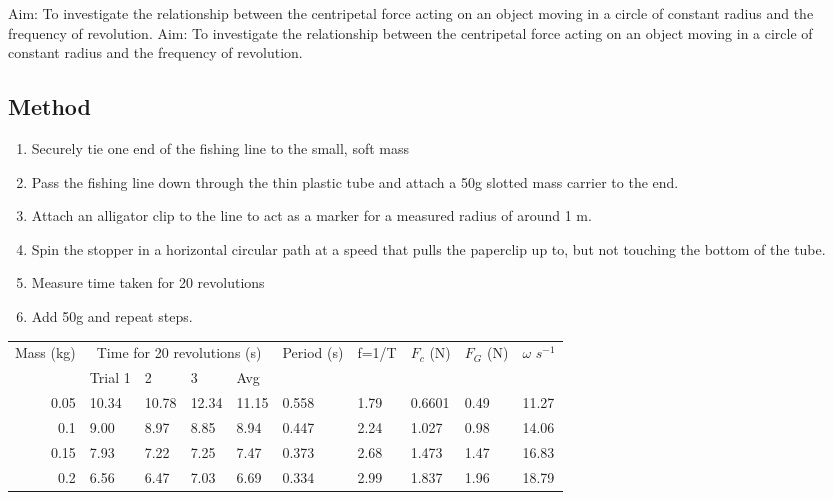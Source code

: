 	Aim: To investigate the relationship between the centripetal force acting on an object moving in a circle of constant radius and the frequency of revolution.
	Aim: To investigate the relationship between the centripetal force acting on an object moving in a circle of constant radius and the frequency of revolution.

	\subsection{Method}
		\begin{enumerate}
			\item Securely tie one end of the fishing line to the small, soft mass
			\item Pass the fishing line down through the thin plastic tube and attach a 50g slotted mass carrier to the end.
			\item Attach an alligator clip to the line to act as a marker for a measured radius of around 1 m.
			\item Spin the stopper in a horizontal circular path at a speed that pulls the paperclip up to, but not touching the bottom of the tube.
			\item Measure time taken for 20 revolutions
			\item Add 50g and repeat steps.
		\end{enumerate}

		\begin{table}[htbp]
			\centering
			\begin{tabular}{llllllllll}
			Mass (kg) & \multicolumn{4}{c}{Time for 20 revolutions (s)} & \multicolumn{1}{l}{Period (s)} & \multicolumn{1}{l}{f=1/T} & \multicolumn{1}{l}{$F_c$ (N)} & \multicolumn{1}{l}{$F_G$ (N)} & \multicolumn{1}{l}{$\omega$ \textdegree$s^{-1}$} \\
					& \multicolumn{1}{l}{Trial 1} & 2     & 3     & \multicolumn{1}{l}{Avg} &       &       &       &       &  \\ \hline
			\multicolumn{1}{r}{0.05} & 10.34 & 10.78 & 12.34 & 11.15 & 0.558 & 1.79  & 0.6601 & 0.49  & 11.27 \\
			\multicolumn{1}{r}{0.1} & 9.00  & 8.97  & 8.85  & 8.94  & 0.447 & 2.24  & 1.027 & 0.98  & 14.06 \\
			\multicolumn{1}{r}{0.15} & 7.93  & 7.22  & 7.25  & 7.47  & 0.373 & 2.68  & 1.473 & 1.47  & 16.83 \\
			\multicolumn{1}{r}{0.2} & 6.56  & 6.47  & 7.03  & 6.69  & 0.334 & 2.99  & 1.837 & 1.96  & 18.79 \\
			\end{tabular}
		\end{table}
		
